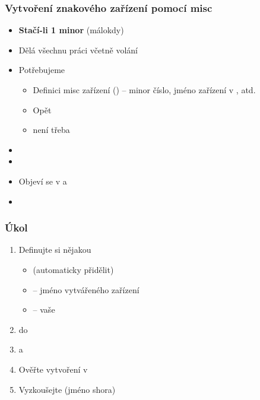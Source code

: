 \begin{frame}
  \frametitle{Vytvoření znakového zařízení pomocí misc}

  \begin{itemize}
  \item \textbf{Stačí-li 1 minor} (málokdy)
  \item Dělá všechnu práci včetně volání 

  \pause

  \item Potřebujeme
    \begin{itemize}
      \item Definici misc zařízení () -- minor číslo,
        jméno zařízení v , atd.
      \item Opět 
      \item {} není třeba
    \end{itemize}
    \item {}
    \item {}
    \item Objeví se v  a 
    \item {}
  \end{itemize}

\end{frame}

\begin{frame}
  \frametitle{Úkol}

  \begin{enumerate}
    \item Definujte si nějakou 
    \begin{itemize}
      \item {} (automaticky přidělit)
      \item {} -- jméno vytvářeného zařízení
      \item {} -- vaše 
    \end{itemize}

    \item {} do 
    \item {} a 
    \item Ověřte vytvoření v 
    \item Vyzkoušejte  (jméno shora)
  \end{enumerate}
\end{frame}

